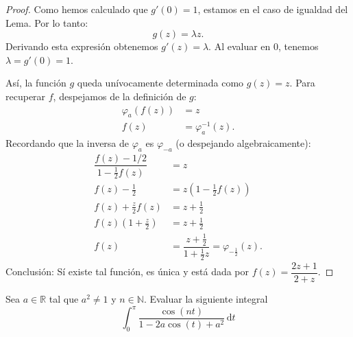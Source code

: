 \documentclass{article}
\newcommand{\R}{\mathbb{R}}
\newcommand{\N}{\mathbb{N}}
\newenvironment{theorem}[2][Ejercicio]{\begin{trivlist}
\item[\hskip\labelsep{\bfseries #1}\hskip\labelsep{\bfseries #2.}]}{\end{trivlist}}
\begin{document}
\begin{proof}
    Como hemos calculado que \( g'(0) = 1 \), estamos en el caso de igualdad del Lema. Por lo tanto:
    \[
        g(z) = \lambda z.
    \]
    Derivando esta expresión obtenemos \( g'(z) = \lambda \). Al evaluar en 0, tenemos \( \lambda = g'(0) = 1 \).

    Así, la función \( g \) queda unívocamente determinada como \( g(z) = z \). Para recuperar \( f \), despejamos de la definición de \( g \):
    \begin{align*}
        \varphi_a(f(z)) & = z                  \\
        f(z)            & = \varphi_a^{-1}(z).
    \end{align*}
    Recordando que la inversa de \( \varphi_a \) es \( \varphi_{-a} \) (o despejando algebraicamente):
    \begin{align*}
        \dfrac{f(z) - 1/2}{1 - \frac{1}{2}f(z)} & = z                                                                      \\
        f(z) - \frac{1}{2}                      & = z \left( 1 - \frac{1}{2} f(z) \right)                                  \\
        f(z) + \frac{z}{2} f(z)                 & = z + \frac{1}{2}                                                        \\
        f(z) \left( 1 + \frac{z}{2} \right)     & = z + \frac{1}{2}                                                        \\
        f(z)                                    & = \dfrac{z + \frac{1}{2}}{1 + \frac{1}{2}z} = \varphi_{-\frac{1}{2}}(z).
    \end{align*}
    Conclusión: Sí existe tal función, es única y está dada por \( f(z) = \dfrac{2z + 1}{2 + z} \).
\end{proof}

\clearpage

\begin{theorem}{5}
    Sea \( a \in \R \) tal que \( a^2 \neq 1 \) y \( n \in \N \). Evaluar la siguiente integral \[
        \int_0^{\pi} \dfrac{\cos(nt)}{1-2a \cos(t) + a^2} \, \mathrm{d}t
    \]
\end{theorem}
\end{document}
